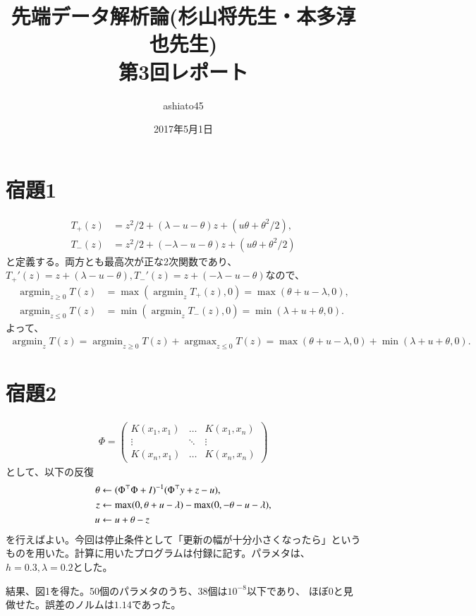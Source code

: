\documentclass[9pt]{ltjsarticle}
\title{先端データ解析論(杉山将先生・本多淳也先生)\\第3回レポート}
\author{ashiato45}
\date{2017年5月1日}
\newcommand{\argmin}{\mathop{\mathrm{argmin}}}
\newcommand{\argmax}{\mathop{\mathrm{argmax}}}
\begin{document}
\maketitle

\section*{宿題1}
\begin{align}
 T_+(z) &= z^2/2 + (\lambda-u-\theta)z + (u\theta + \theta^2/2),\\
 T_-(z)&= z^2/2 + (-\lambda-u-\theta)z + (u\theta + \theta^2/2)
\end{align}
と定義する。両方とも最高次が正な2次関数であり、$T_+'(z)=z+(\lambda-u-\theta),
T_-'(z)=z+(-\lambda-u-\theta)$なので、
\begin{align}
 \argmin_{z\ge 0} T(z) &= \max\left(\argmin_z T_+(z), 0\right) = \max(\theta+u-\lambda, 0),\\
 \argmin_{z\le 0}T(z)& = \min\left(\argmin_z T_-(z), 0\right) = \min(\lambda+u+\theta, 0).
\end{align}
よって、
\begin{align}
 \argmin_z T(z) = \argmin_{z\ge 0} T(z) + \argmax_{z\le 0} T(z) = \max(\theta+u-\lambda, 0) + \min(\lambda+u+\theta, 0).
\end{align}

\section*{宿題2}
\begin{align}
 \Phi = 
\begin{pmatrix}
 K(x_1,x_1) & \ldots & K(x_1,x_n)\\
 \vdots&\ddots & \vdots\\
 K(x_n,x_1)&\ldots & K(x_n,x_n)
\end{pmatrix}
\end{align}
として、以下の反復
\begin{align}
 \theta & \leftarrow (\Phi^\top\Phi + I)^{-1} (\Phi^\top y + z-u),\\
 z& \leftarrow \max(0,\theta+u-\lambda) - \max(0,-\theta-u-\lambda),\\
 u& \leftarrow u+\theta-z
\end{align}
を行えばよい。今回は停止条件として「更新の幅が十分小さくなったら」という
ものを用いた。計算に用いたプログラムは付録に記す。パラメタは、$h=0.3,
\lambda=0.2$とした。

結果、図1を得た。50個のパラメタのうち、38個は$10^{-8}$以下であり、
ほぼ0と見做せた。誤差のノルムは$1.14$であった。
\end{document}
